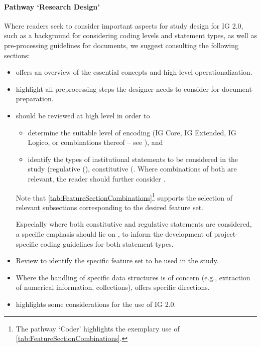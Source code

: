 \paragraph{Pathway `Research Design'}

Where readers seek to consider important aspects for study design for IG 2.0, such as a background for considering coding levels and statement types, as well as pre-processing guidelines for documents, we suggest consulting the following sections:

\begin{itemize}
\item {} offers an overview of the essential concepts and high-level operationalization. 
\item {} highlight all preprocessing steps the designer needs to consider for document preparation.
\item {} should be reviewed at high level in order to 
	\begin{itemize}
	\item determine the suitable level of encoding (IG Core, IG Extended, IG Logico, or combinations thereof -- see ), and 
	\item identify the types of institutional statements to be considered in the study (regulative (), constitutive (. Where combinations of both are relevant, the reader should further consider . 
	\end{itemize}
	Note that \cref{tab:FeatureSectionCombinations}\footnote{The pathway `Coder' highlights the exemplary use of \cref{tab:FeatureSectionCombinations}.} supports the selection of relevant subsections corresponding to the desired feature set. 

Especially where both constitutive and regulative statements are considered, a specific emphasis should lie on , to inform the development of project-specific coding guidelines for both statement types.
\item Review  to identify the specific feature set to be used in the study.
\item Where the handling of specific data structures is of concern (e.g., extraction of numerical information, collections),  offers specific directions.
\item {} highlights some considerations for the use of IG 2.0.
\end{itemize}

